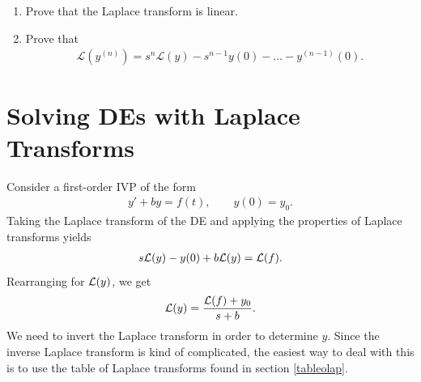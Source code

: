 \documentclass{book}
\begin{document}
\begin{enumerate}
    \item
      Prove that the Laplace transform is linear.

    \item
      Prove that
      \begin{align*}
      \mathcal{L}(y^{(n)})
      = s^n \mathcal{L}(y) -s^{n-1} y(0) -\dots -y^{(n-1)}(0).
      \end{align*}

\end{enumerate}


\chapter{Solving DEs with Laplace Transforms}

Consider a first-order IVP of the form
\begin{align*}
y' + by = f(t), \qquad y(0)=y_0.
\end{align*}
Taking the Laplace transform of the DE and applying the properties of Laplace
transforms yields
\begin{align*}
s\mathcal{L} (y) - y(0) + b \mathcal{L}(y) = \mathcal{L}(f).
\end{align*}
Rearranging for $\mathcal{L}(y)$, we get
\begin{align*}
\mathcal{L}(y) =\frac{\mathcal{L}(f) + y_0}{s+b}.
\end{align*}
We need to invert the Laplace transform in order to determine $y$.
Since the inverse Laplace transform is kind of complicated, the easiest
way to deal with this is to use the table of Laplace transforms found in
section \ref{tableolap}.
\end{document}
